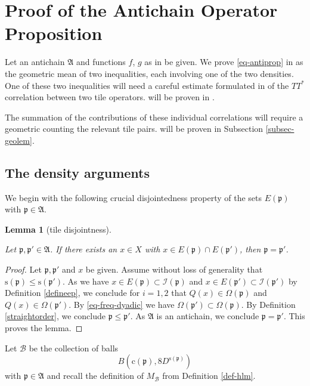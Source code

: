 \documentclass[10pt,a4paper]{article}
\theoremstyle{plain}
\newtheorem{lemma}[theorem]{Lemma}
\theoremstyle{definition}
\numberwithin{equation}{subsection}
\newcommand{\fp}{{\mathfrak p}}
\newcommand{\pc}{{\mathrm{c}}}
\newcommand{\ps}{{\mathrm{s}}}
\newcommand{\fc}{{\Omega}}
\newcommand{\scI}{{\mathcal{I}}} %
\newcommand{\tQ}{{Q}}
\newcommand{\lean}[1]{}
\newcommand{\leanok}{}
\begin{document}
\section{Proof of the Antichain Operator Proposition}

\label{antichainboundary}

Let an antichain $\mathfrak{A}$
and functions $f$, $g$ as in  be given.
We prove \eqref{eq-antiprop}
in 
as the geometric mean of two inequalities,
each involving one of the two densities.
One of these two inequalities will need a careful estimate formulated in
 of
the $TT^*$ correlation between two tile operators.
 will be proven in
.

The summation of the contributions of these individual correlations will require a
geometric  counting the relevant tile pairs.
 will be proven in Subsection
\ref{subsec-geolem}.






\subsection{The density arguments}\label{sec-TT*-T*T}

We begin with the following crucial disjointedness property of the sets $E(\fp)$ with $\fp \in \mathfrak{A}$.
\begin{lemma}[tile disjointness]
\label{tile-disjointness}
\leanok
\lean{tile_disjointness}
Let $\fp,\fp'\in \mathfrak{A}$.
If there exists an $x\in X$ with $x\in E(\fp)\cap E(\fp')$,
then $\fp= \fp'$.
\end{lemma}
\begin{proof}
\leanok
Let $\fp,\fp'$ and $x$ be given.
Assume without loss of generality that $\ps(\fp)\le \ps(\fp')$.
As we have $x\in E(\fp)\subset \scI(\fp)$ and $x\in E(\fp')\subset \scI(\fp')$ by Definition \eqref{defineep}, we conclude
for $i=1,2$ that
$\tQ(x)\in\fc(\fp)$ and $\tQ(x)\in\fc(\fp')$. By \eqref{eq-freq-dyadic} we have $\fc(\fp')\subset \fc(\fp)$. By Definition
\eqref{straightorder}, we conclude $\fp\le \fp'$. As $\mathfrak{A}$ is an antichain, we conclude $\fp=\fp'$.
This proves the lemma.
\end{proof}



Let $\mathcal{B}$ be the collection of balls
\begin{equation}
    B(\pc(\fp), 8D^{\ps(\fp)})
\end{equation}
with $\fp\in \mathfrak{A}$ and recall the definition of
$M_{\mathcal{B}}$ from Definition \ref{def-hlm}.
\end{document}
